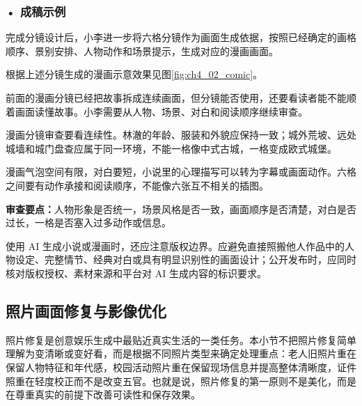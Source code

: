 \subsubsection*{\textbf{• 成稿示例}}

完成分镜设计后，小李进一步将六格分镜作为画面生成依据，按照已经确定的画格顺序、景别安排、人物动作和场景提示，生成对应的漫画画面。

根据上述分镜生成的漫画示意效果见图\ref{fig:ch4_02_comic}。

\par\vspace{1em}

\par
\noindent\begin{minipage}{\textwidth}
\centering
{}
\label{fig:ch4_02_comic}
\end{minipage}
\par

\par\vspace{1em}

前面的漫画分镜已经把故事拆成连续画面，但分镜能否使用，还要看读者能不能顺着画面读懂故事。小李需要从人物、场景、对白和阅读顺序继续审查。

\begin{critiquebox}
漫画分镜审查要看连续性。林澈的年龄、服装和外貌应保持一致；城外荒坡、远处城墙和城门盘查应属于同一环境，不能一格像中式古城，一格变成欧式城堡。

漫画气泡空间有限，对白要短，小说里的心理描写可以转为字幕或画面动作。六格之间要有动作承接和阅读顺序，不能像六张互不相关的插图。

\textbf{审查要点：}人物形象是否统一，场景风格是否一致，画面顺序是否清楚，对白是否过长，一格是否塞入过多动作或信息。
\end{critiquebox}

使用 AI 生成小说或漫画时，还应注意版权边界。应避免直接照搬他人作品中的人物设定、完整情节、经典对白或具有明显识别性的画面设计；公开发布时，应同时核对版权授权、素材来源和平台对 AI 生成内容的标识要求。

\subsection{照片画面修复与影像优化}

照片修复是创意娱乐生成中最贴近真实生活的一类任务。本小节不把照片修复简单理解为变清晰或变好看，而是根据不同照片类型来确定处理重点：老人旧照片重在保留人物特征和年代感，校园活动照片重在保留现场信息并提高整体清晰度，证件照重在轻度校正而不是改变五官。也就是说，照片修复的第一原则不是美化，而是在尊重真实的前提下改善可读性和保存效果。

